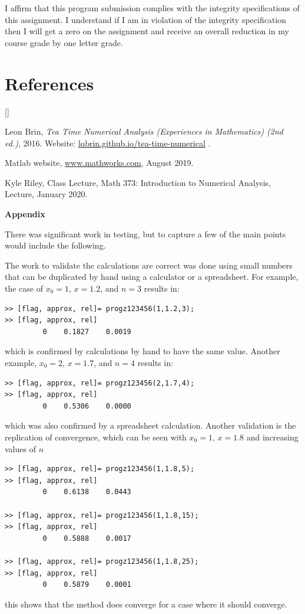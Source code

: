 \documentclass{article}
\def\ds{\displaystyle}
\def\beginrefs{\begin{list}%
        {[\arabic{equation}]}{\usecounter{equation}
         \setlength{\leftmargin}{2.0truecm}\setlength{\labelsep}{0.4truecm}%
         \setlength{\labelwidth}{1.6truecm}}}
\def\endrefs{\end{list}}
\def\bibentry#1{\item[\hbox{[#1]}]}
\begin{document}
I affirm that this program submission complies with the integrity specifications of this assignment. I understand if I am in violation of the integrity specification then I will get a zero on the assignment and receive an overall reduction in my course grade by one letter grade. 

\section*{References}
\beginrefs


\bibentry{LB16}{\sc Leon Brin},
{\it Tea Time Numerical Analysis (Experiences in Mathematics)  (2nd ed.)}, 2016. Website: \href{http://lqbrin.github.io/tea-time-numerical/}{lqbrin.github.io/tea-time-numerical} .

\bibentry{Matlab} {\sc Matlab website}, \href{https://www.mathworks.com}{www.mathworks.com}, August 2019. %

\bibentry{KR20} {\sc Kyle Riley}, Class Lecture, Math 373: Introduction to Numerical Analysis, Lecture, January 2020. 

\endrefs

\bigskip \par \bigskip
{\Large {\bf Appendix}} \par \medskip
There was significant work in testing, but to capture a few of the main points would include the following.

The work to validate the calculations are correct was done using small numbers that can be duplicated by hand using a calculator or a spreadsheet. For example, the case of $\ds x_0= 1$, $x=1.2$, and $n=3$ results in:
\begin{verbatim}
>> [flag, approx, rel]= progz123456(1,1.2,3);
>> [flag, approx, rel]
         0    0.1827    0.0019
\end{verbatim}
which is confirmed by calculations by hand to have the same value. Another example, $x_0=2$, $x=1.7$, and $n=4$ results in:
\begin{verbatim}
>> [flag, approx, rel]= progz123456(2,1.7,4);
>> [flag, approx, rel]
         0    0.5306    0.0000
\end{verbatim}
which was also confirmed by a spreadsheet calculation. Another validation is the replication of convergence, which can be seen with $\ds x_0=1$, $x=1.8$ and increasing values of $n$
\begin{verbatim}
>> [flag, approx, rel]= progz123456(1,1.8,5);
>> [flag, approx, rel]
         0    0.6138    0.0443
         
>> [flag, approx, rel]= progz123456(1,1.8,15);
>> [flag, approx, rel]
         0    0.5888    0.0017

>> [flag, approx, rel]= progz123456(1,1.8,25);
>> [flag, approx, rel]
         0    0.5879    0.0001
\end{verbatim}
this shows that the method does converge for a case where it should converge. 
\end{document}
